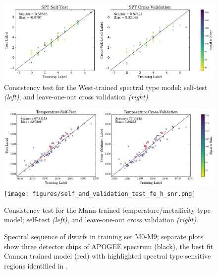 \documentclass[modern]{aastex62}
\begin{document}
\newpage

\begin{figure}[ht]
\begin{center}
\includegraphics[width=18cm]{figures/self_and_validation_test_spt_snr.png}
\end{center}
\caption{Consistency test for the West-trained spectral type model; self-test \textit{(left)}, and leave-one-out cross validation \textit{(right)}.} \label{fig:west_selftest}
\end{figure}

\begin{figure}[ht]
\begin{center}
\includegraphics[width=18cm]{figures/self_and_validation_test_teff_snr.png}
\texttt{[image: figures/self\_and\_validation\_test\_fe\_h\_snr.png]}
\end{center}
\caption{Consistency test for the Mann-trained temperature/metallicity type model; self-test \textit{(left)}, and leave-one-out cross validation \textit{(right)}.} \label{fig:mann_selftest}
\end{figure}

\begin{figure}[ht]
\caption{ Spectral sequence of dwarfs in training set M0-M9; separate plots show three detector chips of APOGEE spectrum (black), the best fit Cannon trained model (red) with highlighted spectral type sensitive regions identified in \citealt{Desphande:2013}.} \label{fig:sp_sequence}
\end{figure}
\end{document}

